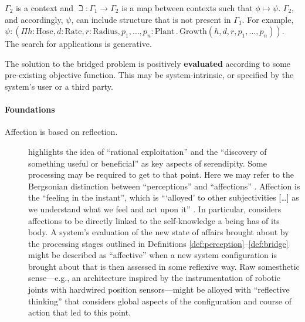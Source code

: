 $\Gamma_2$ is a context and $\beth : \Gamma_1 \rightarrow \Gamma_2$ is
a map between contexts such that $\phi \mapsto \psi$.  $\Gamma_2$, and
accordingly, $\psi$, can include structure that is not present in
$\Gamma_1$.  For example, $\psi : (\Pi h:\mathrm{Hose},
d:\mathrm{Rate}, r:\mathrm{Radius}, p_1,\ldots,p_n:\mathrm{Plant}
\mathbin{.}  \mathrm{Growth}(h,d,r,p_1,\ldots,p_n))$.  The search for
applications is generative.

\begin{center}
\asterism
\end{center}



\begin{defn}\label{def:result}
\hypertarget{def:result}{}The solution to the bridged problem is positively 
\textbf{evaluated} according to some pre-existing objective function.
This may be system-intrinsic, or specified by the system's user or a third party.
\end{defn}

\paragraph{\textbf{\upshape Foundations}}
                                         
\begin{description}                      
\item[Affection is based on reflection.]
\citet{campbell2005serendipity} highlights the idea of ``rational
exploitation'' and the ``discovery of something useful or
beneficial'' as key aspects of serendipity.
Some processing may be required
to get to that point. Here we may refer to the Bergsonian
distinction
between ``perceptions'' and ``affections''
\cite[p.~23]{deleuze1991bergsonism}.
Affection is the ``feeling in the instant'', which is {``}`alloyed'
to other subjectivities [\ldots] as we understand what we feel and
act upon it'' \cite[p.~141]{sutton2008deleuze}.
In particular,
\citet[p.~17]{bergson1991matter} considers affections to be directly
linked to the self-knowledge a being has of its body.  A system's
evaluation of the new state of affairs brought about by the processing
stages outlined in Definitions \ref{def:perception}--\ref{def:bridge}
might be described as ``affective''
when a new system configuration is brought about that is then assessed
in some reflexive way.  Raw somesthetic sense---e.g., an architecture inspired by
the instrumentation of robotic joints with hardwired position
sensors---might be alloyed with ``reflective thinking'' \cite{singh2005architecture}
that considers global aspects of the configuration and course of action
that led to this point.
\end{description}                        

